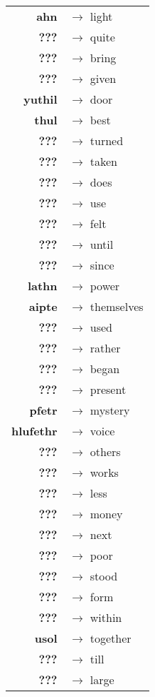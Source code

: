 \begin{tabular}{rl}
\textbf{ahn} & $\rightarrow$ light \\
\textbf{???} & $\rightarrow$ quite \\
\textbf{???} & $\rightarrow$ bring \\
\textbf{???} & $\rightarrow$ given \\
\textbf{yuthil} & $\rightarrow$ door \\
\textbf{thul} & $\rightarrow$ best \\
\textbf{???} & $\rightarrow$ turned \\
\textbf{???} & $\rightarrow$ taken \\
\textbf{???} & $\rightarrow$ does \\
\textbf{???} & $\rightarrow$ use \\
\textbf{???} & $\rightarrow$ felt \\
\textbf{???} & $\rightarrow$ until \\
\textbf{???} & $\rightarrow$ since \\
\textbf{lathn} & $\rightarrow$ power \\
\textbf{aipte} & $\rightarrow$ themselves \\
\textbf{???} & $\rightarrow$ used \\
\textbf{???} & $\rightarrow$ rather \\
\textbf{???} & $\rightarrow$ began \\
\textbf{???} & $\rightarrow$ present \\
\textbf{pfetr} & $\rightarrow$ mystery \\
\textbf{hlufethr} & $\rightarrow$ voice \\
\textbf{???} & $\rightarrow$ others \\
\textbf{???} & $\rightarrow$ works \\
\textbf{???} & $\rightarrow$ less \\
\textbf{???} & $\rightarrow$ money \\
\textbf{???} & $\rightarrow$ next \\
\textbf{???} & $\rightarrow$ poor \\
\textbf{???} & $\rightarrow$ stood \\
\textbf{???} & $\rightarrow$ form \\
\textbf{???} & $\rightarrow$ within \\
\textbf{usol} & $\rightarrow$ together \\
\textbf{???} & $\rightarrow$ till \\
\textbf{???} & $\rightarrow$ large \\

\end{tabular}

